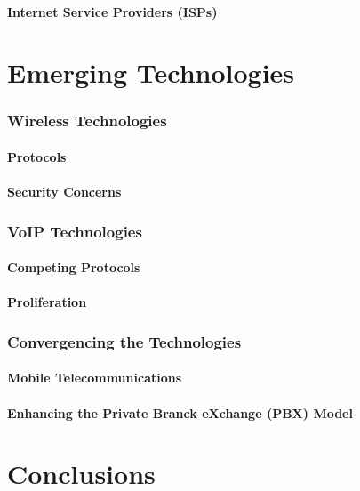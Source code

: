 \documentclass[a4paper,12pt]{article}
\begin{document}
\subsection{Internet Service Providers (ISPs)}

\part{Emerging Technologies}

\section{Wireless Technologies}

\subsection{Protocols}

\subsection{Security Concerns}

\section{VoIP Technologies}

\subsection{Competing Protocols}

\subsection{Proliferation}

\section{Convergencing the Technologies}

\subsection{Mobile Telecommunications}

\subsection{Enhancing the Private Branck eXchange (PBX) Model}

\part{Conclusions}
\end{document}
